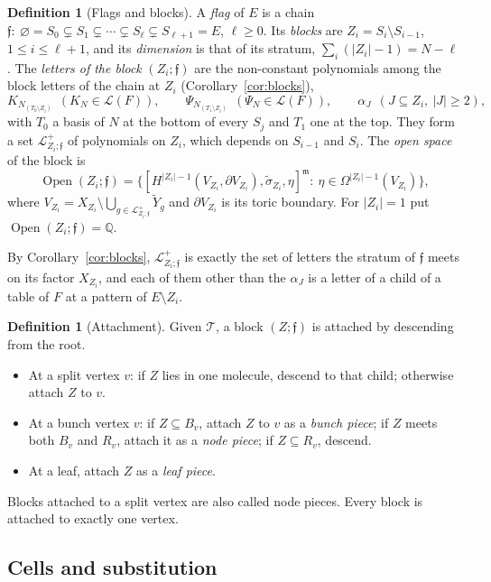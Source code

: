 \documentclass[11pt]{article}
\theoremstyle{plain}
\theoremstyle{definition}
\newtheorem{defn}[prop]{Definition}
\theoremstyle{remark}
\newcommand{\cL}{\mathcal L}
\newcommand{\cT}{\mathcal T}
\newcommand{\Q}{\mathbb Q}
\newcommand{\m}{\mathfrak m}
\newcommand{\ff}{\mathfrak f}
\newcommand{\Open}{\operatorname{Open}}
\newcommand{\tsig}{\widetilde\sigma}
\begin{document}
\begin{defn}[Flags and blocks]\label{def:blocks}
A \emph{flag} of $E$ is a chain $\ff:\ \varnothing=S_0\subsetneq S_1\subsetneq\cdots\subsetneq S_\ell\subsetneq S_{\ell+1}=E$, $\ell\ge0$. Its \emph{blocks} are $Z_i=S_i\setminus S_{i-1}$, $1\le i\le \ell+1$, and its \emph{dimension} is that of its stratum, $\sum_i(|Z_i|-1)=N-\ell$. The \emph{letters of the block} $(Z_i;\ff)$ are the non-constant polynomials among the block letters of the chain at $Z_i$ (Corollary~\ref{cor:blocks}),
\[
K_{N_{(T_0\setminus Z_i)}}\ \ (K_N\in\cL(F)),\qquad \Psi_{N_{(T_1\setminus Z_i)}}\ \ (\Psi_N\in\cL(F)),\qquad \alpha_J\ \ (J\subseteq Z_i,\ |J|\ge2),
\]
with $T_0$ a basis of $N$ at the bottom of every $S_j$ and $T_1$ one at the top.
They form a set $\cL^+_{Z_i;\ff}$ of polynomials on $Z_i$, which depends on $S_{i-1}$ and $S_i$. The \emph{open space} of the block is
\[
\Open(Z_i;\ff)=\big\{[H^{|Z_i|-1}(V_{Z_i},\partial V_{Z_i}),\tsig_{Z_i},\eta]^{\m}:\ \eta\in\Omega^{|Z_i|-1}(V_{Z_i})\big\},
\]
where $V_{Z_i}=X_{Z_i}\setminus\bigcup_{g\in\cL^+_{Z_i;\ff}}\widetilde Y_g$ and $\partial V_{Z_i}$ is its toric boundary. For $|Z_i|=1$ put $\Open(Z_i;\ff)=\Q$.
\end{defn}

By Corollary~\ref{cor:blocks}, $\cL^+_{Z_i;\ff}$ is exactly the set of letters the stratum of $\ff$ meets on its factor $X_{Z_i}$, and each of them other than the $\alpha_J$ is a letter of a child of a table of $F$ at a pattern of $E\setminus Z_i$.

\begin{defn}[Attachment]\label{def:attach}
Given $\cT$, a block $(Z;\ff)$ is attached by descending from the root.
\begin{itemize}
\item At a split vertex $v$: if $Z$ lies in one molecule, descend to that child; otherwise attach $Z$ to $v$.
\item At a bunch vertex $v$: if $Z\subseteq B_v$, attach $Z$ to $v$ as a \emph{bunch piece}; if $Z$ meets both $B_v$ and $R_v$, attach it as a \emph{node piece}; if $Z\subseteq R_v$, descend.
\item At a leaf, attach $Z$ as a \emph{leaf piece}.
\end{itemize}
Blocks attached to a split vertex are also called node pieces. Every block is attached to exactly one vertex.
\end{defn}

\subsection{Cells and substitution}
\end{document}
